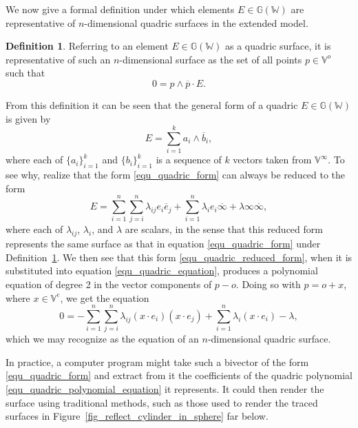 \documentclass{birkjour}
\theoremstyle{definition}
\newtheorem{defn}[thm]{Definition}
\theoremstyle{remark}
\numberwithin{equation}{section}
\newcommand{\G}{\mathbb{G}}
\newcommand{\V}{\mathbb{V}}
\newcommand{\W}{\mathbb{W}}
\newcommand{\nvao}{o}
\newcommand{\nvai}{\infty}
\newcommand{\nvaib}{\overline{\infty}}
\begin{document}
We now give a formal definition under which elements $E\in\G(\W)$
are representative of $n$-dimensional quadric surfaces in the extended model.
\begin{defn}\label{def_quadric}
Referring to an element $E\in\G(\W)$ as a quadric surface, it is representative of such an $n$-dimensional
surface as the set of all points $p\in\V^o$ such that
\begin{equation}\label{equ_quadric_equation}
0 = p\wedge\overline{p}\cdot E.
\end{equation}
\end{defn}
From this definition it can be seen that the general form of a quadric $E\in\G(\W)$ is given by
\begin{equation}\label{equ_quadric_form}
E = \sum_{i=1}^k a_i\wedge\overline{b}_i,
\end{equation}
where each of $\{a_i\}_{i=1}^k$ and $\{b_i\}_{i=1}^k$ is a sequence of $k$ vectors
taken from $\V^\nvai$.  To see why, realize that the form \eqref{equ_quadric_form} can
always be reduced to the form
\begin{equation}\label{equ_quadric_reduced_form}
E = \sum_{i=1}^n\sum_{j=i}^n\lambda_{ij}e_i\overline{e}_j+
\sum_{i=1}^n\lambda_i e_i\nvaib+
\lambda\nvai\nvaib,
\end{equation}
where each of $\lambda_{ij}$, $\lambda_i$, and $\lambda$ are scalars, in the
sense that this reduced form represents the same surface as that in equation \eqref{equ_quadric_form}
under Definition~\ref{def_quadric}.
We then see that this form \eqref{equ_quadric_reduced_form}, when it is
substituted into equation \eqref{equ_quadric_equation}, produces a polynomial
equation of degree 2 in the vector components of $p-\nvao$.
Doing so with $p=\nvao+x$, where $x\in\V^e$, we get the equation
\begin{equation}\label{equ_quadric_polynomial_equation}
0 = -\sum_{i=1}^n\sum_{j=i}^n\lambda_{ij}(x\cdot e_i)(x\cdot e_j)
+\sum_{i=1}^n\lambda_i(x\cdot e_i) - \lambda,
\end{equation}
which we may recognize as the equation of an $n$-dimensional quadric surface.

In practice, a computer program might take such a bivector of the form \eqref{equ_quadric_form}
and extract from it the coefficients of the quadric polynomial \eqref{equ_quadric_polynomial_equation} it
represents.  It could then render the surface using traditional methods, such as those used
to render the traced surfaces in Figure~\ref{fig_reflect_cylinder_in_sphere} far below.
\end{document}
